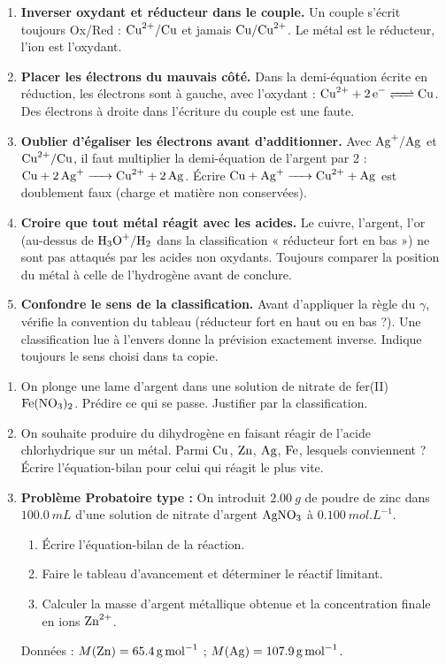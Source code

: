 \documentclass[11pt]{article}
\begin{document}
\begin{attention}
\begin{enumerate}
\item \textbf{Inverser oxydant et réducteur dans le couple.} Un couple s'écrit toujours Ox/Red : $\ce{Cu^2+}/\ce{Cu}$ et jamais $\ce{Cu}/\ce{Cu^2+}$. Le métal est le réducteur, l'ion est l'oxydant.
\item \textbf{Placer les électrons du mauvais côté.} Dans la demi-équation écrite en réduction, les électrons sont à gauche, avec l'oxydant : $\ce{Cu^2+ + 2e- <=> Cu}$. Des électrons à droite dans l'écriture du couple est une faute.
\item \textbf{Oublier d'égaliser les électrons avant d'additionner.} Avec $\ce{Ag+}/\ce{Ag}$ et $\ce{Cu^2+}/\ce{Cu}$, il faut multiplier la demi-équation de l'argent par 2 : $\ce{Cu + 2Ag+ -> Cu^2+ + 2Ag}$. Écrire $\ce{Cu + Ag+ -> Cu^2+ + Ag}$ est doublement faux (charge et matière non conservées).
\item \textbf{Croire que tout métal réagit avec les acides.} Le cuivre, l'argent, l'or (au-dessus de $\ce{H3O+}/\ce{H2}$ dans la classification « réducteur fort en bas ») ne sont pas attaqués par les acides non oxydants. Toujours comparer la position du métal à celle de l'hydrogène avant de conclure.
\item \textbf{Confondre le sens de la classification.} Avant d'appliquer la règle du $\gamma$, vérifie la convention du tableau (réducteur fort en haut ou en bas ?). Une classification lue à l'envers donne la prévision exactement inverse. Indique toujours le sens choisi dans ta copie.
\end{enumerate}
\end{attention}

\begin{exercice}
\begin{enumerate}
\item On plonge une lame d'argent dans une solution de nitrate de fer(II) $\ce{Fe(NO3)2}$. Prédire ce qui se passe. Justifier par la classification.
\item On souhaite produire du dihydrogène en faisant réagir de l'acide chlorhydrique sur un métal. Parmi $\ce{Cu}$, $\ce{Zn}$, $\ce{Ag}$, $\ce{Fe}$, lesquels conviennent ? Écrire l'équation-bilan pour celui qui réagit le plus vite.
\item \textbf{Problème Probatoire type :} On introduit $\SI{2,00}{g}$ de poudre de zinc dans $\SI{100,0}{mL}$ d'une solution de nitrate d'argent $\ce{AgNO3}$ à $\SI{0,100}{mol.L^{-1}}$.
\begin{enumerate}
\item Écrire l'équation-bilan de la réaction.
\item Faire le tableau d'avancement et déterminer le réactif limitant.
\item Calculer la masse d'argent métallique obtenue et la concentration finale en ions $\ce{Zn^2+}$.
\end{enumerate}
Données : $M(\ce{Zn}) = \SI{65,4}{g.mol^{-1}}$ ; $M(\ce{Ag}) = \SI{107,9}{g.mol^{-1}}$.
\end{enumerate}
\end{exercice}
\end{document}
